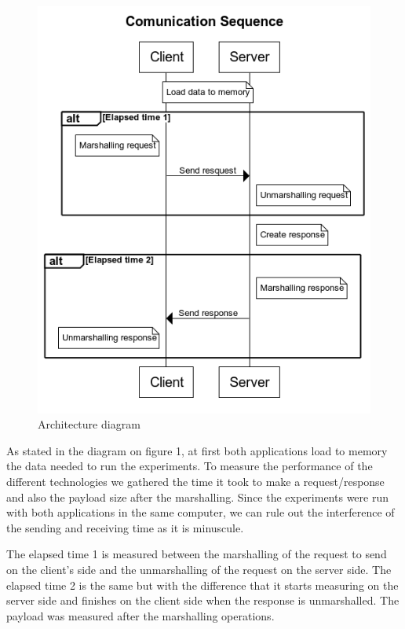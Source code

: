 \documentclass{article}
\begin{document}
\begin{figure}[hbt!]
 \centering
 \includegraphics[scale=0.4]{Comunication_Sequence.png}
 \caption{Architecture diagram}
\end{figure}

\qquad As stated in the diagram on figure 1, at first both applications load to memory the data needed to run the experiments. To measure the performance of the different technologies we gathered the time it took to make a request/response and also the payload size after the marshalling. Since the experiments were run with both applications in the same computer, we can rule out the interference of the sending and receiving time as it is minuscule.

\qquad The elapsed time 1 is measured between the marshalling of the request to send on the client's side and the unmarshalling of the request on the server side. The elapsed time 2 is the same but with the difference that it starts measuring on the server side and finishes on the client side when the response is unmarshalled. The payload was measured after the marshalling operations.
\end{document}
